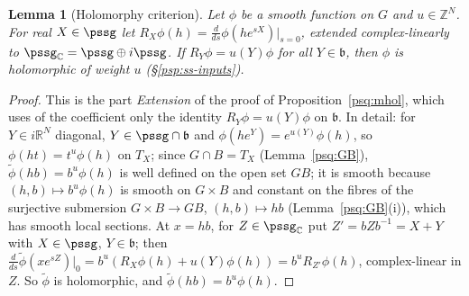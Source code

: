 \documentclass[10pt]{amsart}
\newtheorem{lemma}[theorem]{Lemma}
\theoremstyle{definition}
\theoremstyle{remark}
\newcommand{\C}{\mathbb C}
\newcommand{\R}{\mathbb R}
\newcommand{\Z}{\mathbb Z}
\begin{document}
\begin{lemma}[Holomorphy criterion]\label{pss:ext}
Let $\phi$ be a smooth function on $G$ and $u\in\Z^N$. For real $X\in\pssg$ let $R_X\phi(h)=\frac d{ds}\phi(he^{sX})|_{s=0}$,
extended complex-linearly to $\pssg_\C=\pssg\oplus i\pssg$. If $R_Y\phi=u(Y)\phi$ for all $Y\in\mathfrak b$, then
$\phi$ is holomorphic of weight $u$ \textup(\S\ref{psp:ss-inputs}\textup).
\end{lemma}
\begin{proof}
This is the part \emph{Extension} of the proof of Proposition~\ref{psq:mhol}, which uses of the
coefficient only the identity $R_Y\phi=u(Y)\phi$ on $\mathfrak b$. In detail: for $Y\in i\R^N$ diagonal,
$Y\in\pssg\cap\mathfrak b$ and $\phi(he^{Y})=e^{u(Y)}\phi(h)$, so $\phi(ht)=t^u\phi(h)$ on $T_X$; since $G\cap B=T_X$
(Lemma~\ref{psq:GB}), $\tilde\phi(hb)=b^u\phi(h)$ is well defined on the open set $GB$; it is smooth because $(h,b)\mapsto b^u\phi(h)$ is smooth on $G\times B$ and
constant on the fibres of the surjective submersion $G\times B\to GB$, $(h,b)\mapsto hb$ (Lemma~\ref{psq:GB}(i)), which has
smooth local sections. At $x=hb$,
for $Z\in\pssg_\C$ put $Z'=bZb^{-1}=X+Y$ with $X\in\pssg$, $Y\in\mathfrak b$; then
$\frac d{ds}\tilde\phi(xe^{sZ})|_0=b^u(R_X\phi(h)+u(Y)\phi(h))=b^uR_{Z'}\phi(h)$, complex-linear in $Z$.
So $\tilde\phi$ is holomorphic, and $\tilde\phi(hb)=b^u\phi(h)$.
\end{proof}
\end{document}

